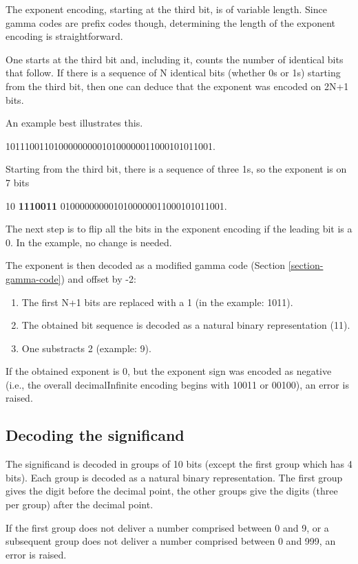 \documentclass{acm_proc_article-sp}
\begin{document}
The exponent encoding, starting at the third bit, is of variable length. Since gamma codes are prefix codes though, determining the length of the exponent encoding is straightforward.

One starts at the third bit and, including it, counts the number of identical bits that follow. If there is a sequence of N identical bits (whether 0s or 1s) starting from the third bit, then one can deduce that the exponent was encoded on 2N+1 bits.

An example best illustrates this.

1011100110100000000010100000011000101011001.

Starting from the third bit, there is a sequence of three 1s, so the exponent is on 7 bits

10 \textbf{1110011} 0100000000010100000011000101011001.

The next step is to flip all the bits in the exponent encoding if the leading bit is a 0. In the example, no change is needed.

The exponent is then decoded as a modified gamma code (Section \ref{section-gamma-code}) and offset by -2:

\begin{enumerate}
\item The first N+1 bits are replaced with a 1 (in the example: 1011).
\item The obtained bit sequence is decoded as a natural binary representation (11).
\item One substracts 2 (example: 9).
\end{enumerate}

If the obtained exponent is 0, but the exponent sign was encoded as negative (i.e., the overall decimalInfinite encoding begins with 10011 or 00100), an error is raised.

\subsection{Decoding the significand}

The significand is decoded in groups of 10 bits (except the first group which has 4 bits). Each group is decoded as a natural binary representation. The first group gives the digit before the decimal point, the other groups give the digits (three per group) after the decimal point.

If the first group does not deliver a number comprised between 0 and 9, or a subsequent group does not deliver a number comprised between 0 and 999, an error is raised.
\end{document}
